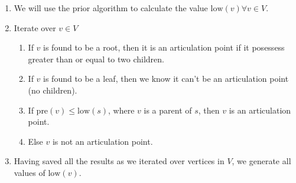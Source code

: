 \documentclass{article}
\begin{document}
\begin{enumerate}
      \item We will use the prior algorithm to calculate the value \(\text{low}(v) \forall
            v \in V \).
      \item Iterate over \(v \in V \) \begin{enumerate}
                  \item If \(v\) is found to be a root, then it is an
                        articulation point if it posessess greater than or equal to two children.
                  \item If \(v\) is found to be a leaf, then we know it can't be an articulation
                        point (no children).
                  \item If \(\text{pre}(v) \leq \text{low}(s)\), where \(v\) is a parent of
                        \(s\), then \(v\) is an articulation point.
                  \item Else \(v\) is not an articulation point.
            \end{enumerate}
      \item Having saved all the results as we iterated over vertices in \(V\), we
            generate all values of \(\text{low}(v)\).
\end{enumerate}
\end{document}
